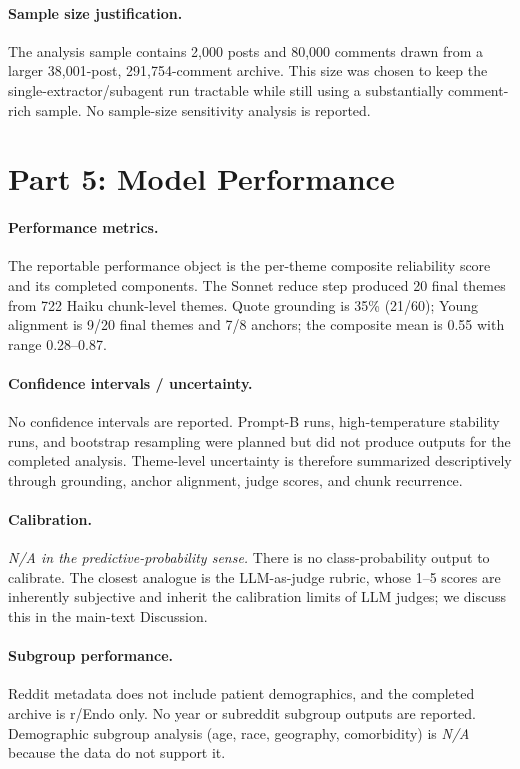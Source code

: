 \documentclass[11pt]{article}
\begin{document}
\paragraph{Sample size justification.}
The analysis sample contains 2{,}000 posts and 80{,}000 comments drawn
from a larger 38{,}001-post, 291{,}754-comment archive. This size was
chosen to keep the single-extractor/subagent run tractable while still
using a substantially comment-rich sample. No sample-size sensitivity
analysis is reported.

\section*{Part 5: Model Performance}

\paragraph{Performance metrics.}
The reportable performance object is the per-theme composite
reliability score and its completed components. The Sonnet reduce step
produced 20 final themes from 722 Haiku chunk-level themes. Quote
grounding is 35\% (21/60); Young alignment is 9/20 final themes and
7/8 anchors; the composite mean is 0.55 with range 0.28--0.87.

\paragraph{Confidence intervals / uncertainty.}
No confidence intervals are reported. Prompt-B runs, high-temperature
stability runs, and bootstrap resampling were planned but did not
produce outputs for the completed analysis. Theme-level uncertainty is
therefore summarized descriptively through grounding, anchor alignment,
judge scores, and chunk recurrence.

\paragraph{Calibration.}
\emph{N/A in the predictive-probability sense.} There is no
class-probability output to calibrate. The closest analogue is the
LLM-as-judge rubric, whose 1--5 scores are inherently subjective and
inherit the calibration limits of LLM judges; we discuss this in the
main-text Discussion.

\paragraph{Subgroup performance.}
Reddit metadata does not include patient demographics, and the completed
archive is r/Endo only. No year or subreddit subgroup outputs are
reported. Demographic subgroup analysis (age, race, geography,
comorbidity) is \emph{N/A} because the data do not support it.
\end{document}
